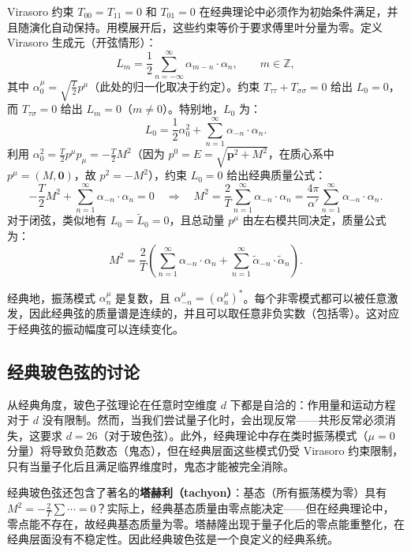 Virasoro 约束 $T_{00}=T_{11}=0$ 和 $T_{01}=0$ 在经典理论中必须作为初始条件满足，并且随演化自动保持。用模展开后，这些约束等价于要求傅里叶分量为零。定义 Virasoro 生成元（开弦情形）：
\begin{equation}
L_m = \frac12 \sum_{n=-\infty}^{\infty} \alpha_{m-n} \cdot \alpha_n,\qquad m\in\mathbb{Z},
\end{equation}
其中 $\alpha_0^\mu = \sqrt{\frac{T}{2}} p^\mu$（此处的归一化取决于约定）。约束 $T_{\tau\tau}+T_{\sigma\sigma}=0$ 给出 $L_0=0$，而 $T_{\tau\sigma}=0$ 给出 $L_m=0$（$m\neq 0$）。特别地，$L_0$ 为：
\begin{equation}
L_0 = \frac{1}{2} \alpha_0^2 + \sum_{n=1}^{\infty} \alpha_{-n}\cdot \alpha_n.
\end{equation}
利用 $\alpha_0^2 = \frac{T}{2} p^\mu p_\mu = -\frac{T}{2} M^2$（因为 $p^0 = E = \sqrt{\mathbf{p}^2+M^2}$，在质心系中 $p^\mu=(M,\mathbf{0})$，故 $p^2 = -M^2$），约束 $L_0=0$ 给出经典质量公式：
\begin{equation}
-\frac{T}{2} M^2 + \sum_{n=1}^{\infty} \alpha_{-n}\cdot \alpha_n = 0 \quad\Longrightarrow\quad M^2 = \frac{2}{T} \sum_{n=1}^{\infty} \alpha_{-n}\cdot \alpha_n = \frac{4\pi}{\alpha'} \sum_{n=1}^{\infty} \alpha_{-n}\cdot \alpha_n.
\end{equation}
对于闭弦，类似地有 $L_0=\tilde{L}_0=0$，且总动量 $p^\mu$ 由左右模共同决定，质量公式为：
\begin{equation}
M^2 = \frac{2}{T} \left( \sum_{n=1}^{\infty} \alpha_{-n}\cdot \alpha_n + \sum_{n=1}^{\infty} \tilde{\alpha}_{-n}\cdot \tilde{\alpha}_n \right).
\end{equation}

经典地，振荡模式 $\alpha_n^\mu$ 是复数，且 $\alpha_{-n}^\mu = (\alpha_n^\mu)^*$。每个非零模式都可以被任意激发，因此经典弦的质量谱是连续的，并且可以取任意非负实数（包括零）。这对应于经典弦的振动幅度可以连续变化。

\subsection*{经典玻色弦的讨论}

从经典角度，玻色子弦理论在任意时空维度 $d$ 下都是自洽的：作用量和运动方程对于 $d$ 没有限制。然而，当我们尝试量子化时，会出现反常——共形反常必须消失，这要求 $d=26$（对于玻色弦）。此外，经典理论中存在类时振荡模式（$\mu=0$ 分量）将导致负范数态（鬼态），但在经典层面这些模式仍受 Virasoro 约束限制，只有当量子化后且满足临界维度时，鬼态才能被完全消除。

经典玻色弦还包含了著名的\textbf{塔赫利（tachyon）}：基态（所有振荡模为零）具有 $M^2 = -\frac{2}{T}\sum \cdots = 0$？实际上，经典基态质量由零点能决定——但在经典理论中，零点能不存在，故经典基态质量为零。塔赫隆出现于量子化后的零点能重整化，在经典层面没有不稳定性。因此经典玻色弦是一个良定义的经典系统。

